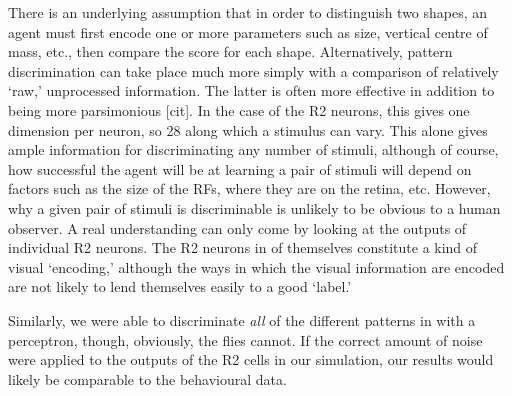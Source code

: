 There is an underlying assumption that in order to distinguish two shapes, an agent must first encode one or more parameters such as size, vertical centre of mass, etc., then compare the score for each shape.
Alternatively, pattern discrimination can take place much more simply with a comparison of relatively `raw,' unprocessed information.
The latter is often more effective in addition to being more parsimonious [cit].
In the case of the R2 neurons, this gives one dimension per neuron, so 28 along which a stimulus can vary.
This alone gives ample information for discriminating any number of stimuli, although of course, how successful the agent will be at learning a pair of stimuli will depend on factors such as the size of the \acp{RF}, where they are on the retina, etc.
However, why a given pair of stimuli is discriminable is unlikely to be obvious to a human observer.
A real understanding can only come by looking at the outputs of individual R2 neurons.
The R2 neurons in of themselves constitute a kind of visual `encoding,' although the ways in which the visual information are encoded are not likely to lend themselves easily to a good `label.'

Similarly, we were able to discriminate \emph{all} of the different patterns in \cite{Ernst1999} with a perceptron, though, obviously, the flies cannot.
If the correct amount of noise were applied to the outputs of the R2 cells in our simulation, our results would likely be comparable to the behavioural data.

